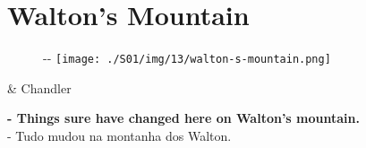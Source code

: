 \hypertarget{waltons-mountain}{%
\section{Walton's Mountain}\label{waltons-mountain}}

\begin{figure}[!ht]
  \begin{adjustwidth}{-\oddsidemargin-1in}{-\rightmargin}
    \centering
    \texttt{[image: ./S01/img/13/walton-s-mountain.png]}
  \end{adjustwidth}
\end{figure}

\begin{tcolorbox}[enhanced,center upper,
    drop fuzzy shadow southeast, boxrule=0.3pt,
    lower separated=false, breakable,
    colframe=black!30!dialogoBorder,colback=white]
\begin{minipage}[c]{0.16\linewidth}
   & \centering \scriptsize{Chandler}
\end{minipage}
\hfill
\begin{minipage}[c]{0.8\linewidth}
  \textbf{- Things sure have changed here on Walton's mountain.}\\
  - Tudo mudou na montanha dos Walton.
\end{minipage}
\end{tcolorbox}

